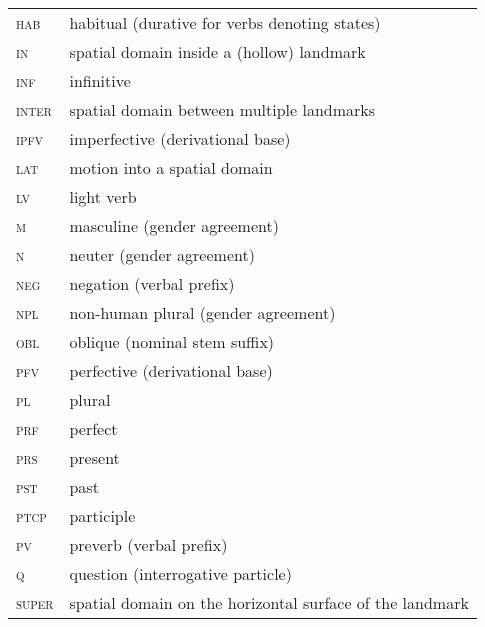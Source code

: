 ﻿\documentclass[output=paper]{langsci/langscibook}
\begin{document}
\begin{longtable}[l]{@{}ll@{}}
\textsc{hab}	& habitual (durative for verbs denoting states) \\
\textsc{in}	& spatial domain inside a (hollow) landmark \\
\textsc{inf}	& infinitive \\
\textsc{inter}	& spatial domain between multiple landmarks \\
\textsc{ipfv}	& imperfective (derivational base) \\
\textsc{lat}	& motion into a spatial domain \\
\textsc{lv}	& light verb \\
\textsc{m}	& masculine (gender agreement) \\
\textsc{n}	& neuter (gender agreement) \\
\textsc{neg}	& negation (verbal prefix) \\
\textsc{npl}	& non-human plural (gender agreement) \\
\textsc{obl}	& oblique (nominal stem suffix) \\
\textsc{pfv}	& perfective (derivational base) \\
\textsc{pl}	& plural \\
\textsc{prf}	& perfect \\
\textsc{prs}	& present \\
\textsc{pst}	& past \\
\textsc{ptcp}	& participle \\
\textsc{pv}	& preverb (verbal prefix) \\
\textsc{q}	& question (interrogative particle) \\
\textsc{super}	& spatial domain on the horizontal surface of the landmark \\
\end{longtable}

\printbibliography[heading=subbibliography,notkeyword=this]
\end{document}
